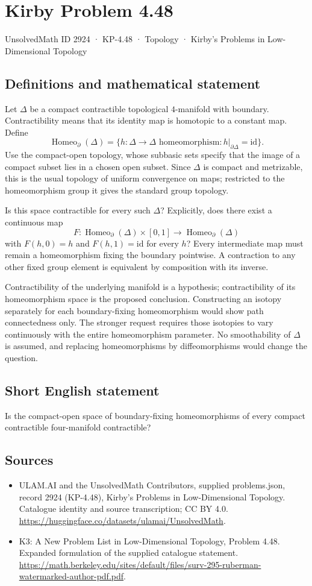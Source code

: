 \documentclass[11pt,a4paper]{article}
\begin{document}
\section*{Kirby Problem 4.48}\label{2924}
{\small UnsolvedMath ID 2924 · KP-4.48 · Topology · Kirby's Problems in Low-Dimensional Topology}
\subsection{Definitions and mathematical statement}
Let $\Delta$ be a compact contractible topological $4$-manifold with
boundary. Contractibility means that its identity map is homotopic
to a constant map. Define
\[
 \operatorname{Homeo}_{\partial}(\Delta)
 =\{h:\Delta\to\Delta\text{ homeomorphism}:h|_{\partial\Delta}=\mathrm{id}\}.
\]
Use the compact-open topology, whose subbasic sets specify that the
image of a compact subset lies in a chosen open subset. Since $\Delta$
is compact and metrizable, this is the usual topology of uniform
convergence on maps; restricted to the homeomorphism group it gives
the standard group topology.

Is this space contractible for every such $\Delta$? Explicitly, does
there exist a continuous map
\[
 F:\operatorname{Homeo}_{\partial}(\Delta)\times[0,1]
           \longrightarrow\operatorname{Homeo}_{\partial}(\Delta)
\]
with $F(h,0)=h$ and $F(h,1)=\mathrm{id}$ for every $h$?
Every intermediate map must remain a homeomorphism fixing the boundary
pointwise. A contraction to any other fixed group element is equivalent
by composition with its inverse.

Contractibility of the underlying manifold is a hypothesis; contractibility
of its homeomorphism space is the proposed conclusion. Constructing
an isotopy separately for each boundary-fixing homeomorphism would show
path connectedness only. The stronger request requires those isotopies
to vary continuously with the entire homeomorphism parameter.
No smoothability of $\Delta$ is assumed, and replacing homeomorphisms
by diffeomorphisms would change the question.
\subsection{Short English statement}
Is the compact-open space of boundary-fixing homeomorphisms of every compact contractible four-manifold contractible?
\subsection{Sources}
\begin{itemize}
\item[S1] ULAM.AI and the UnsolvedMath Contributors, supplied problems.json, record 2924 (KP-4.48), Kirby's Problems in Low-Dimensional Topology. Catalogue identity and source transcription; CC BY 4.0.
\url{https://huggingface.co/datasets/ulamai/UnsolvedMath}.
\item[S2] K3: A New Problem List in Low-Dimensional Topology, Problem 4.48. Expanded formulation of the supplied catalogue statement.
\url{https://math.berkeley.edu/sites/default/files/surv-295-ruberman-watermarked-author-pdf.pdf}.
\end{itemize}
\end{document}
